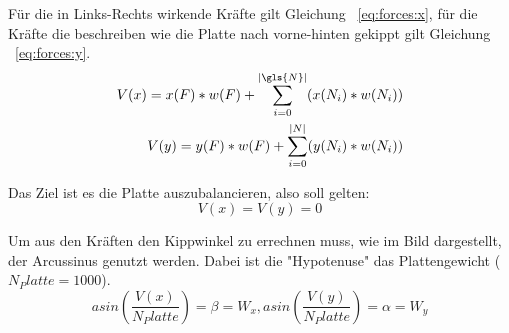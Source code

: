 F{\"{u}}r die in Links-Rechts wirkende Kr{\"{a}}fte gilt Gleichung ~\ref{eq:forces:x}, f{\"{u}}r die Kr{\"{a}}fte die beschreiben wie die Platte nach vorne-hinten gekippt gilt Gleichung ~\ref{eq:forces:y}.
\begin{subequations}\label{eq:forces}
\begin{align}
	V(x) = x(F) * w(F) + \sum_{i=0}^{|\gls{N}|} ( x(N_i) * w(N_i) ) \label{eq:forces:x}\\
	V(y) = y(F) * w(F) + \sum_{i=0}^{|N|} ( y(N_i) * w(N_i) ) \label{eq:forces:y}
\end{align}
\end{subequations}

Das Ziel ist es die Platte auszubalancieren, also soll gelten:
\begin{equation}\label{eq:gleichgewicht}
	V(x) = V(y) = 0
\end{equation}

Um aus den Kr{\"{a}}ften den Kippwinkel zu errechnen muss, wie im Bild dargestellt, der Arcussinus genutzt werden. Dabei ist die "Hypotenuse" das Plattengewicht ($ N_Platte = 1000$). 
$$ asin(\frac{V(x)}{ N_Platte}) = \beta = W_{x}, asin(\frac{V(y)}{N_Platte}) = \alpha = W_{y} $$


